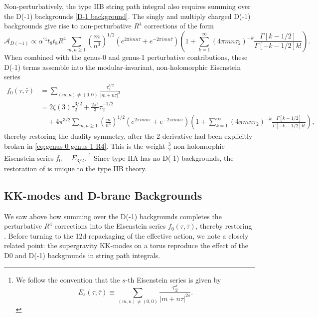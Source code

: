Non-perturbatively, the type IIB string path integral also requires summing over the D(-1) backgrounds \eqref{D-1 background}.
The singly and multiply charged D(-1) backgrounds give rise to non-perturbative $R^4$ corrections \cite{Green:1997tv,Kehagias:1997cq} of the form
\begin{equation}
\mathcal A_{D(-1)}\propto \alpha^{\prime 4}t_8t_8R^4\sum_{m,n\ge1}\left(\frac{m}{n^3}\right)^{1/2}
(e^{2\pi i mn\tau}+e^{-2\pi i mn\bar{\tau}})
\left(
1+\sum_{k=1}^\infty(4\pi mn\tau_2)^{-k}\frac{\Gamma[k-1/2]}{\Gamma[-k-1/2]k!}
\right).
\end{equation}
When combined with the genus-0 and genus-1 perturbative contributions, these D(-1) terms assemble into the modular-invariant, non-holomorphic Eisenstein series
\begin{equation}
\begin{aligned}
f_0(\tau,\bar\tau)
&=\sum_{(m,n)\neq(0,0)}\frac{\tau_2^{3/2}}{|m+n\tau|^3}\\
&=2\zeta(3)\tau_2^{3/2}+\frac{2\pi^2}{3}\tau_2^{-1/2}\\
&\quad+4\pi^{3/2}\sum_{m,n\ge1}\left(\frac{m}{n^3}\right)^{1/2}
(e^{2\pi i mn\tau}+e^{-2\pi i mn\bar{\tau}})
\left(
1+\sum_{k=1}^\infty(4\pi mn\tau_2)^{-k}\frac{\Gamma[k-1/2]}{\Gamma[-k-1/2]k!}
\right),
\end{aligned}
\label{eq:f0-eisenstein}
\end{equation}
thereby restoring the \SLZ{} duality symmetry, after the 2-derivative \SLR{} had been explicitly broken in \eqref{eq:genus-0-genus-1-R4}.
This is the weight-$\tfrac32$ non-holomorphic Eisenstein series $f_0 = E_{3/2}$. 
\footnote{We follow the convention that the $s$-th Eisenstein series is given by 
\begin{equation}
E_s(\tau,\bar\tau) \equiv \sum_{(m,n)\neq(0,0)} \frac{\tau_2^{s}}{|m+n\tau|^{2s}}.
\end{equation}}
Since type IIA has no D(-1) backgrounds, the restoration of \SLZ{} is unique to the type IIB theory.

\subsection{KK-modes and D-brane Backgrounds}
We saw above how summing over the D(-1) backgrounds completes the perturbative $R^4$ corrections into the Eisenstein series $f_0(\tau,\bar\tau)$, thereby restoring \SLZ{}.
Before turning to the 12d repackaging of the effective action, we note a closely related point: the supergravity KK-modes on a torus reproduce the effect of the D0 and D(-1) backgrounds in string path integrals.

